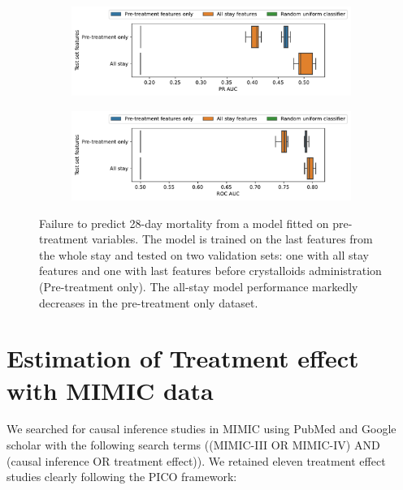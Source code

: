 \documentclass[french,12pt,twoside,a4paper]{book}
\begin{document}
\begin{appendices}
  \begin{figure}[!h]
    \begin{subfigure}{\linewidth}
      \centering
      \includegraphics[width=0.9\linewidth]{img/chapter_4/predictive_failure__pr_auc.pdf}
      \caption{}\label{apd:fig:motivating_example_pr_auc}
    \end{subfigure}
    \hfill
    \begin{subfigure}{\linewidth}
      \centering
      \includegraphics[width=0.9\linewidth]{img/chapter_4/predictive_failure__roc_auc.pdf}
      \caption{}\label{apd:fig:motivating_example_roc_auc}
    \end{subfigure}
    \caption{Failure to predict 28-day mortality from a model fitted on
      pre-treatment variables. The model is trained on the last features from
      the whole stay and tested on two validation sets: one with all stay
      features and one with last features before crystalloids administration
      (Pre-treatment only). The all-stay model performance markedly decreases in
      the pre-treatment only dataset.}\label{apd:fig:motivating_example}
  \end{figure}

  \section{Estimation of Treatment effect with MIMIC data}\label{apd:ate_on_mimic}

  We searched for causal inference studies in MIMIC using PubMed and Google
  scholar with the following search terms ((MIMIC-III OR MIMIC-IV) AND (causal
  inference OR treatment effect)). We retained eleven treatment effect studies
  clearly following the PICO framework:  \begin{itemize}


\end{itemize}
\end{appendices}
\end{document}
